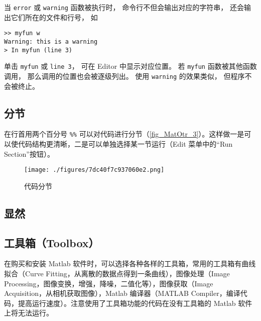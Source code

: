 当 \verb|error| 或 \verb|warning| 函数被执行时， 命令行不但会输出对应的字符串， 还会输出它们所在的文件和行号， 如
\begin{lstlisting}[language=matlabC]
>> myfun w
Warning: this is a warning
> In myfun (line 3)
\end{lstlisting}
单击 \verb|myfun| 或 \verb|line 3|， 可在 Editor 中显示对应位置。 若 \verb|myfun| 函数被其他函数调用， 那么调用的位置也会被逐级列出。 使用 \verb|warning| 的效果类似， 但程序不会被终止。

\subsection{分节}
在行首用两个百分号 \verb|%%| 可以对代码进行分节（\autoref{fig_MatOtr_3}）。这样做一是可以使代码结构更清晰，二是可以单独选择某一节运行（Edit 菜单中的“Run Section”按钮）。
\begin{figure}[ht]
\centering
\texttt{[image: ./figures/7dc40f7c937060e2.png]}
\caption{代码分节}\label{fig_MatOtr_3}
\end{figure}

\subsection{显然}

\subsection{工具箱（Toolbox）}
在购买和安装 Matlab 软件时，可以选择各种各样的工具箱，常用的工具箱有曲线拟合（Curve Fitting，从离散的数据点得到一条曲线），图像处理（Image Processing，图像变换，增强，降噪，二值化等），图像获取（Image Acquisition，从相机获取图像），Matlab 编译器（MATLAB Compiler，编译代码，提高运行速度）。注意使用了工具箱功能的代码在没有工具箱的 Matlab 软件上将无法运行。





